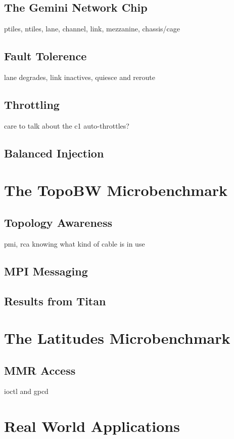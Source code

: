 \documentclass[10pt, conference, compsocconf]{IEEEtran}
\begin{document}
\subsection{The Gemini Network Chip}
ptiles, ntiles, lane, channel, link, mezzanine, chassis/cage

\subsection{Fault Tolerence}
lane degrades, link inactives, quiesce and reroute

\subsection{Throttling}
care to talk about the c1 auto-throttles?

\subsection{Balanced Injection}

\section{The TopoBW Microbenchmark}

\subsection{Topology Awareness}
pmi, rca
knowing what kind of cable is in use

\subsection{MPI Messaging}

\subsection{Results from Titan}

\section{The Latitudes Microbenchmark}

\subsection{MMR Access}
ioctl and gpcd


\section{Real World Applications}
\end{document}
